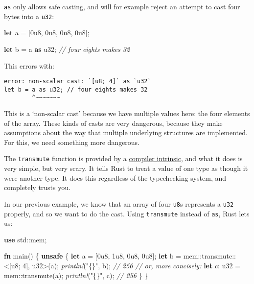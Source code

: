 \documentclass[a4paper,]{book}
\newenvironment{Shaded}{\begin{snugshade}}{\end{snugshade}}
\newcommand{\KeywordTok}[1]{\textcolor[rgb]{0.13,0.29,0.53}{\textbf{{#1}}}}
\newcommand{\DataTypeTok}[1]{\textcolor[rgb]{0.13,0.29,0.53}{{#1}}}
\newcommand{\DecValTok}[1]{\textcolor[rgb]{0.00,0.00,0.81}{{#1}}}
\newcommand{\StringTok}[1]{\textcolor[rgb]{0.31,0.60,0.02}{{#1}}}
\newcommand{\CommentTok}[1]{\textcolor[rgb]{0.56,0.35,0.01}{\textit{{#1}}}}
\newcommand{\PreprocessorTok}[1]{\textcolor[rgb]{0.56,0.35,0.01}{\textit{{#1}}}}
\newcommand{\NormalTok}[1]{{#1}}
\begin{document}
\texttt{as} only allows safe casting, and will for example reject an
attempt to cast four bytes into a \texttt{u32}:

\begin{Shaded}
\begin{Highlighting}[]
\KeywordTok{let} \NormalTok{a = [}\DecValTok{0u8}\NormalTok{, }\DecValTok{0u8}\NormalTok{, }\DecValTok{0u8}\NormalTok{, }\DecValTok{0u8}\NormalTok{];}

\KeywordTok{let} \NormalTok{b = a }\KeywordTok{as} \DataTypeTok{u32}\NormalTok{; }\CommentTok{// four eights makes 32}
\end{Highlighting}
\end{Shaded}

This errors with:

\begin{verbatim}
error: non-scalar cast: `[u8; 4]` as `u32`
let b = a as u32; // four eights makes 32
        ^~~~~~~~
\end{verbatim}

This is a `non-scalar cast' because we have multiple values here: the
four elements of the array. These kinds of casts are very dangerous,
because they make assumptions about the way that multiple underlying
structures are implemented. For this, we need something more dangerous.

The \texttt{transmute} function is provided by a
\protect\hyperlink{sec--intrinsics}{compiler intrinsic}, and what it
does is very simple, but very scary. It tells Rust to treat a value of
one type as though it were another type. It does this regardless of the
typechecking system, and completely trusts you.

In our previous example, we know that an array of four \texttt{u8}s
represents a \texttt{u32} properly, and so we want to do the cast. Using
\texttt{transmute} instead of \texttt{as}, Rust lets us:

\begin{Shaded}
\begin{Highlighting}[]
\KeywordTok{use} \NormalTok{std::mem;}

\KeywordTok{fn} \NormalTok{main() \{}
    \KeywordTok{unsafe} \NormalTok{\{}
        \KeywordTok{let} \NormalTok{a = [}\DecValTok{0u8}\NormalTok{, }\DecValTok{1u8}\NormalTok{, }\DecValTok{0u8}\NormalTok{, }\DecValTok{0u8}\NormalTok{];}
        \KeywordTok{let} \NormalTok{b = mem::transmute::<[}\DataTypeTok{u8}\NormalTok{; }\DecValTok{4}\NormalTok{], }\DataTypeTok{u32}\NormalTok{>(a);}
        \PreprocessorTok{println!}\NormalTok{(}\StringTok{"\{\}"}\NormalTok{, b); }\CommentTok{// 256}
        \CommentTok{// or, more concisely:}
        \KeywordTok{let} \NormalTok{c: }\DataTypeTok{u32} \NormalTok{= mem::transmute(a);}
        \PreprocessorTok{println!}\NormalTok{(}\StringTok{"\{\}"}\NormalTok{, c); }\CommentTok{// 256}
    \NormalTok{\}}
\NormalTok{\}}
\end{Highlighting}
\end{Shaded}
\end{document}
